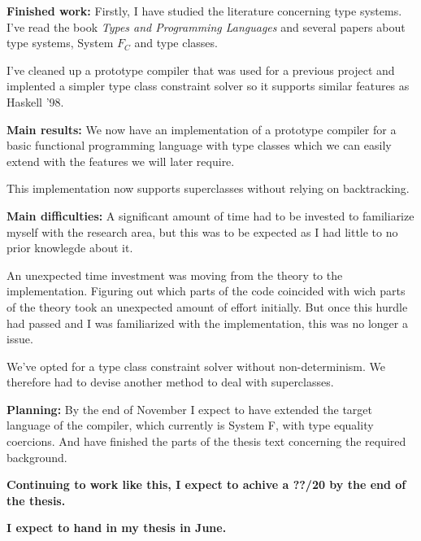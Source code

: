 \documentclass[12pt]{report}
\begin{document}
\vspace{1cm}
{\bf Finished work:}
Firstly, I have studied the literature concerning type systems. I've read the
book \textit{Types and Programming Languages} and several papers about type
systems, System $F_C$ and type classes.

I've cleaned up a prototype compiler that was used for a previous project and
implented a simpler type class constraint solver so it supports similar features
as Haskell '98.

\vspace{1cm}
{\bf Main results:}
We now have an implementation of a prototype compiler for a basic functional
programming language with type classes which we can easily extend with the
features we will later require.

This implementation now supports superclasses without relying on backtracking.

\vspace{1cm}
{\bf Main difficulties:}
A significant amount of time had to be invested to familiarize myself with the
research area, but this was to be expected as I had little to no prior
knowlegde about it.

An unexpected time investment was moving from the theory to the
implementation. Figuring out which parts of the code coincided with wich parts
of the theory took an unexpected amount of effort initially. But once this
hurdle had passed and I was familiarized with the implementation, this was no
longer a issue. %

We've opted for a type class constraint solver without non-determinism. We
therefore had to devise another method to deal with superclasses.

\vspace{1cm}
{\bf Planning:}
By the end of November I expect to have extended the target language of the
compiler, which currently is System F,  with type equality coercions. And have
finished the parts of the thesis text concerning the required background.

\vspace{1cm}
{\bf Continuing to work like this, I expect to achive a ??/20 by the end of the
thesis.}

{\bf I expect to hand in my thesis in June.}
\end{document}
